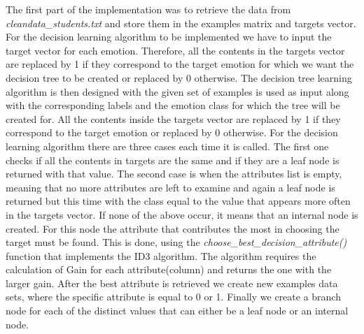 The first part of the implementation was to retrieve the data from
\emph{cleandata\_students.txt} and store them in the examples matrix and targets
vector. For the decision learning algorithm to be implemented we have to input
the target vector for each emotion. Therefore, all the contents in the targets
vector are replaced by 1 if they correspond to the target emotion for which we
want the decision tree to be created or replaced by 0 otherwise. The decision
tree learning algorithm is then designed with the given set of examples is used
as input along with the corresponding labels and the emotion class for which
the tree will be created for.  All the contents inside the targets vector are
replaced by 1 if they correspond to the target emotion or replaced by 0
otherwise. For the decision learning algorithm there are three cases each time
it is called. The first one checks if all the contents in targets are the same
and if they are a leaf node is returned with that value. The second case is
when the attributes list is empty, meaning that no more attributes are left to
examine and again a leaf node is returned but this time with the class equal to
the value that appears more often in the targets vector. If none of the above
occur, it means that an internal node is created. For this node the attribute
that contributes the most in choosing the target must be found. This is done,
using the \emph{choose\_best\_decision\_attribute()} function that implements the ID3 algorithm. The algorithm requires the calculation of Gain for each attribute(column) and returns the one with the larger gain. After the best attribute is retrieved we create new examples data sets, where the specific attribute is equal to 0 or 1. Finally we create a branch node for each of the distinct values that can either be a leaf node or an internal node.
